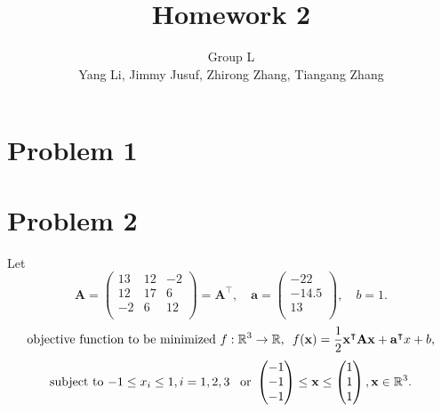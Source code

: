 \documentclass[fleqn]{article}
\title{Homework 2}
\author{Group L\\
Yang Li, Jimmy Jusuf, Zhirong Zhang, Tiangang Zhang}
\newcommand{\mat}[1]{\mathbf{#1}}
\newcommand{\tr}{^\intercal}
\newcommand{\real}{\mathbb{R}}
\begin{document}
\maketitle


\section{Problem 1}

\section{Problem 2}

Let
\begin{equation}
\mat A = \begin{pmatrix}
  13 & 12 & -2 \\
  12 & 17 & 6 \\
  -2 & 6 & 12 \\
  \end{pmatrix} = \mat A\tr,\quad 
\mat a = \begin{pmatrix} -22 \\ -14.5 \\ 13 \\ \end{pmatrix},\quad
b = 1.
\end{equation}
\begin{equation}
\textnormal{objective function to be minimized }f:\real^3\rightarrow\real,
\enskip f(\mat x)=\frac12 \mat x\tr \mat A \mat x + \mat a\tr x + b,
\end{equation}
\begin{equation}\label{eq3}
\textnormal{subject to } {-1}\leq x_i\leq 1, i=1,2,3
\enskip\textnormal{ or } \begin{pmatrix} -1\\-1\\-1 \end{pmatrix}
  \leq \mat x\leq \begin{pmatrix} 1\\1\\1 \end{pmatrix},
  \mat x\in\real^3.
\end{equation}
\end{document}
